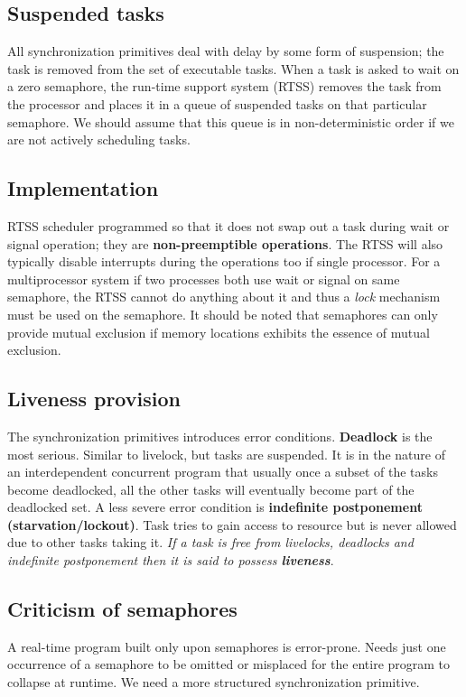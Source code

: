 \subsection{Suspended tasks}
All synchronization primitives deal with delay by some form of suspension; the task is removed from the set of executable tasks. When a task is asked to wait on a zero semaphore, the run-time support system (RTSS) removes the task from the processor and places it in a queue of suspended tasks on that particular semaphore. We should assume that this queue is in non-deterministic order if we are not actively scheduling tasks. 

\subsection{Implementation}
RTSS scheduler programmed so that it does not swap out a task during wait or signal operation; they are \textbf{non-preemptible operations}. The RTSS will also typically disable interrupts during the operations too if single processor. For a multiprocessor system if two processes both use wait or signal on same semaphore, the RTSS cannot do anything about it and thus a \textit{lock} mechanism must be used on the semaphore. It should be noted that semaphores can only provide mutual exclusion if memory locations exhibits the essence of mutual exclusion. 

\subsection{Liveness provision}
The synchronization primitives introduces error conditions. \textbf{Deadlock} is the most serious. Similar to livelock, but tasks are suspended. It is in the nature of an interdependent concurrent program that usually once a subset of the tasks become deadlocked, all the other tasks will eventually become part of the deadlocked set. A less severe error condition is \textbf{indefinite postponement (starvation/lockout)}. Task tries to gain access to resource but is never allowed due to other tasks taking it. \textit{If a task is free from livelocks, deadlocks and indefinite postponement then it is said to possess \textbf{liveness}}.

\subsection{Criticism of semaphores}
A real-time program built only upon semaphores is error-prone. Needs just one occurrence of a semaphore to be omitted or misplaced for the entire program to collapse at runtime. We need a more structured synchronization primitive.

